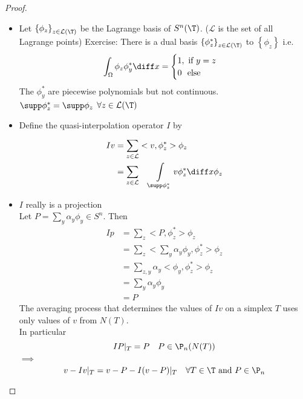 \begin{proof}\
	\begin{itemize}
		\item Let $\left\{ \phi_{z} \right\}_{z \in \mathcal{L}(\T)}$ be the Lagrange basis of $S^n(\T)$. 
			($\mathcal{L}$ is the set of all Lagrange points)
			Exercise: There is a dual basis $\left\{ \phi^*_{z} \right\}_{z \in \mathcal{L}(\T)}$ to $\left\{ \phi_{z} \right\}$ i.e.
			\begin{equation*}
				\int_{\Omega} \phi_{z} \phi^*_{y} \diff x = \begin{cases}
					1, \text{ if } y=z\\
					0\ \text{ else}
				\end{cases}
			\end{equation*}
			The $\phi_{y}^*$ are piecewise polynomials but not continuous.\\
			$\supp \phi_{z}^* = \supp \phi_{z}$ $\forall z \in \mathcal{L}(\T)$ 
		\item Define the quasi-interpolation operator $I$ by 
			\begin{align*}
				Iv &= \sum\limits_{z \in \mathcal{L}}^{} <v,\phi_{z}^*>\phi_{z}\\
				   &= \sum\limits_{z \in \mathcal{L}}^{}\quad \int\limits_{\supp \phi_{z}^*} v\phi_{z}^* \diff x\phi_{z}
			\end{align*}
		\item $I$ really is a projection\\
			Let $P= \sum\limits_{y}^{} \alpha_{y} \phi_{y} \in S^n$. Then 
			\begin{align*}
				Ip &= \sum\limits_{z}^{} <P,\phi_{z}^*>\phi_{z} \\
				   &= \sum\limits_{z}^{} <\sum\limits_{y}^{} \alpha_{y} \phi_{y},\phi_{z}^*>\phi_{z}\\
				   &= \sum\limits_{z,y}^{}\alpha_{y} <\phi_{y},\phi_{z}^*>\phi_{z}\\
				   &= \sum\limits_{y}^{} \alpha_{y} \phi_{y}\\
				   &= P
			\end{align*}
			The averaging process that determines the values of $Iv$ on a simplex $T$ uses only values of $v$ from $N(T)$.\\
			In particular 
			\begin{equation*}
				I P|_{T} = P \quad P \in \P_n(N(T))
			\end{equation*}
			$\implies$
			\begin{equation*}
				v - Iv|_{T} = v-P - I(v-P)|_{T} \quad \forall T \in\T \text{ and } P \in \P_{n}

\end{equation*}
\end{itemize}
\end{proof}
